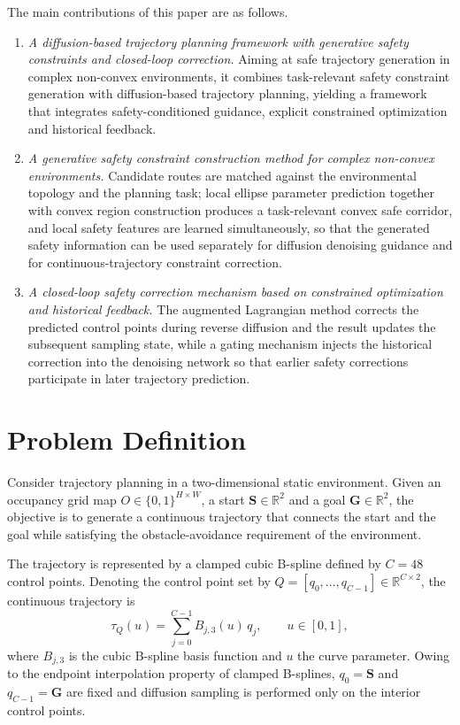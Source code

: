 \documentclass[journal]{IEEEtran}
\newcommand{\R}{\mathbb{R}}
\begin{document}
The main contributions of this paper are as follows.
\begin{enumerate}
\item \emph{A diffusion-based trajectory planning framework with generative
safety constraints and closed-loop correction.} Aiming at safe trajectory
generation in complex non-convex environments, it combines task-relevant safety
constraint generation with diffusion-based trajectory planning, yielding a
framework that integrates safety-conditioned guidance, explicit constrained
optimization and historical feedback.

\item \emph{A generative safety constraint construction method for complex
non-convex environments.} Candidate routes are matched against the
environmental topology and the planning task; local ellipse parameter
prediction together with convex region construction produces a task-relevant
convex safe corridor, and local safety features are learned simultaneously, so
that the generated safety information can be used separately for diffusion
denoising guidance and for continuous-trajectory constraint correction.

\item \emph{A closed-loop safety correction mechanism based on constrained
optimization and historical feedback.} The augmented Lagrangian method corrects
the predicted control points during reverse diffusion and the result updates
the subsequent sampling state, while a gating mechanism injects the historical
correction into the denoising network so that earlier safety corrections
participate in later trajectory prediction.
\end{enumerate}

\section{Problem Definition}
Consider trajectory planning in a two-dimensional static environment. Given an
occupancy grid map $O\in\{0,1\}^{H\times W}$, a start $\bm S\in\R^2$ and a
goal $\bm G\in\R^2$, the objective is to generate a continuous trajectory that
connects the start and the goal while satisfying the obstacle-avoidance
requirement of the environment.

The trajectory is represented by a clamped cubic B-spline defined by
$C=48$ control points. Denoting the control point set by
$Q=[q_0,\ldots,q_{C-1}]\in\R^{C\times2}$, the continuous trajectory is
\begin{equation}
\tau_Q(u)=\sum_{j=0}^{C-1}B_{j,3}(u)\,q_j,\qquad u\in[0,1],
\end{equation}
where $B_{j,3}$ is the cubic B-spline basis function and $u$ the curve
parameter. Owing to the endpoint interpolation property of clamped B-splines,
$q_0=\bm S$ and $q_{C-1}=\bm G$ are fixed and diffusion sampling is performed
only on the interior control points.
\end{document}
